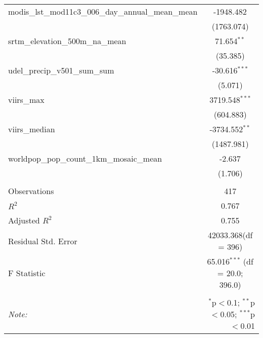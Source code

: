 \begin{table}[!htbp]
\begin{tabular}{@{\extracolsep{5pt}}lc}
 modis_lst_mod11c3_006_day_annual_mean_mean & -1948.482$^{}$ \\
  & (1763.074) \\
 srtm_elevation_500m_na_mean & 71.654$^{**}$ \\
  & (35.385) \\
 udel_precip_v501_sum_sum & -30.616$^{***}$ \\
  & (5.071) \\
 viirs_max & 3719.548$^{***}$ \\
  & (604.883) \\
 viirs_median & -3734.552$^{**}$ \\
  & (1487.981) \\
 worldpop_pop_count_1km_mosaic_mean & -2.637$^{}$ \\
  & (1.706) \\
\hline \\[-1.8ex]
 Observations & 417 \\
 $R^2$ & 0.767 \\
 Adjusted $R^2$ & 0.755 \\
 Residual Std. Error & 42033.368(df = 396)  \\
 F Statistic & 65.016$^{***}$ (df = 20.0; 396.0) \\
\hline
\hline \\[-1.8ex]
\textit{Note:} & \multicolumn{1}{r}{$^{*}$p$<$0.1; $^{**}$p$<$0.05; $^{***}$p$<$0.01} \\
\end{tabular}
\end{table}
